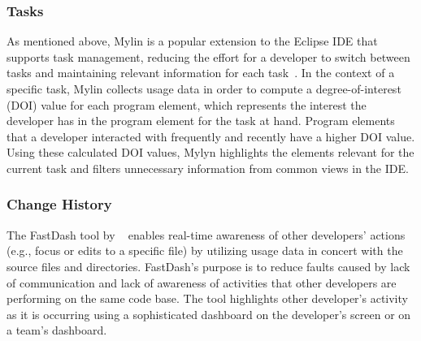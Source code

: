 \subsubsection{Tasks}

As mentioned above, Mylin is a popular extension to the Eclipse IDE that supports task
management, reducing the effort for a developer to switch between
tasks and maintaining relevant information for each
task~\cite{Kersten-Mylyn}. In the context of a specific task, Mylin
collects usage data in order to compute a degree-of-interest (DOI)
value for each program element, which represents the interest the
developer has in the program element for the task at hand. Program elements that a developer interacted with frequently and recently have a higher DOI value. Using these calculated DOI values, Mylyn highlights the elements relevant for the current task and filters unnecessary information from common views in the IDE. 

\subsubsection{Change History}

The FastDash tool by ~ enables real-time awareness of other developers'
actions (e.g., focus or edits to a specific file) by utilizing usage
data in concert with the source files and
directories. FastDash's purpose is to reduce faults
caused by lack of communication and lack of awareness of activities
that other developers are performing on the same code base. The tool
highlights other developer's activity as it is occurring using a
sophisticated dashboard on the developer's screen or on a team's dashboard.




